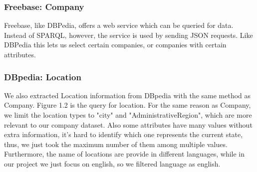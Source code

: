 \subsubsection{Freebase: Company}
Freebase, like DBPedia, offers a web service which can be queried for data. Instead of SPARQL, however, the service is used by sending JSON requests. Like DBPedia this lets us select certain companies, or companies with certain attributes.


\subsubsection{DBpedia: Location}
We also extracted Location information from DBpedia with the same method as Company. Figure 1.2 is the query for location. For the same reason as Company, we limit the location types to "city" and "AdministrativeRegion", which are more relevant to our company dataset. Also some attributes have many values without extra information, it's hard to identify which one represents the current state, thus, we just took the maximum number of them among multiple values. Furthermore, the name of locations are provide in different languages, while in our project we just focus on english, so we filtered language as english.


